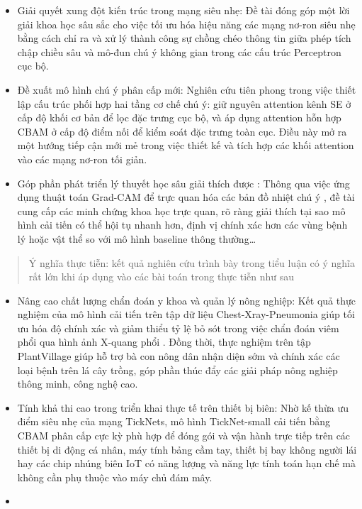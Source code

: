 \documentclass[
]{article}
\begin{document}
\begin{itemize}
\item
  Giải quyết xung đột kiến trúc trong mạng siêu nhẹ: Đề tài đóng góp một
  lời giải khoa học sâu sắc cho việc tối ưu hóa hiệu năng các mạng
  nơ-ron siêu nhẹ bằng cách chỉ ra và xử lý thành công sự chồng chéo
  thông tin giữa phép tích chập chiều sâu và mô-đun chú ý không gian
  trong các cấu trúc Perceptron cục bộ.
\item
  Đề xuất mô hình chú ý phân cấp mới: Nghiên cứu tiên phong trong việc
  thiết lập cấu trúc phối hợp hai tầng cơ chế chú ý: giữ nguyên
  attention kênh SE ở cấp độ khối cơ bản để lọc đặc trưng cục bộ, và áp
  dụng attention hỗn hợp CBAM ở cấp độ điểm nối để kiểm soát đặc trưng
  toàn cục. Điều này mở ra một hướng tiếp cận mới mẻ trong việc thiết kế
  và tích hợp các khối attention vào các mạng nơ-ron tối giản.
\item
  Góp phần phát triển lý thuyết học sâu giải thích được : Thông qua việc
  ứng dụng thuật toán Grad-CAM để trực quan hóa các bản đồ nhiệt chú ý ,
  đề tài cung cấp các minh chứng khoa học trực quan, rõ ràng giải thích
  tại sao mô hình cải tiến có thể hội tụ nhanh hơn, định vị chính xác
  hơn các vùng bệnh lý hoặc vật thể so với mô hình baseline thông
  thường\ldots{}
\end{itemize}

\begin{quote}
Ý nghĩa thực tiễn: kết quả nghiên cứu trình bày trong tiểu luận có ý
nghĩa rất lớn khi áp dụng vào các bài toán trong thực tiễn như sau
\end{quote}

\begin{itemize}
\item
  Nâng cao chất lượng chẩn đoán y khoa và quản lý nông nghiệp: Kết quả
  thực nghiệm của mô hình cải tiến trên tập dữ liệu Chest-Xray-Pneumonia
  giúp tối ưu hóa độ chính xác và giảm thiểu tỷ lệ bỏ sót trong việc
  chẩn đoán viêm phổi qua hình ảnh X-quang phổi . Đồng thời, thực nghiệm
  trên tập PlantVillage giúp hỗ trợ bà con nông dân nhận diện sớm và
  chính xác các loại bệnh trên lá cây trồng, góp phần thúc đẩy các giải
  pháp nông nghiệp thông minh, công nghệ cao.
\item
  Tính khả thi cao trong triển khai thực tế trên thiết bị biên: Nhờ kế
  thừa ưu điểm siêu nhẹ của mạng TickNets, mô hình TickNet-small cải
  tiến bằng CBAM phân cấp cực kỳ phù hợp để đóng gói và vận hành trực
  tiếp trên các thiết bị di động cá nhân, máy tính bảng cầm tay, thiết
  bị bay không người lái hay các chip nhúng biên IoT có năng lượng và
  năng lực tính toán hạn chế mà không cần phụ thuộc vào máy chủ đám mây.
\item
\end{itemize}
\end{document}
